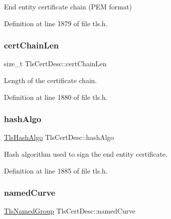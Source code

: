End entity certificate chain (P\+EM format) 



Definition at line 1879 of file tls.\+h.

\mbox{\label{structTlsCertDesc_a3b679e405c99f9989713292148f36149}} 
\subsubsection{\texorpdfstring{cert\+Chain\+Len}{certChainLen}}
{\footnotesize\ttfamily size\+\_\+t Tls\+Cert\+Desc\+::cert\+Chain\+Len}



Length of the certificate chain. 



Definition at line 1880 of file tls.\+h.

\mbox{\label{structTlsCertDesc_ad579e322e6688389f98141972794e243}} 
\subsubsection{\texorpdfstring{hash\+Algo}{hashAlgo}}
{\footnotesize\ttfamily \hyperlink{tls_8h_a98b0299cd7e197edc67123642089156d}{Tls\+Hash\+Algo} Tls\+Cert\+Desc\+::hash\+Algo}



Hash algorithm used to sign the end entity certificate. 



Definition at line 1885 of file tls.\+h.

\mbox{\label{structTlsCertDesc_a8b80a193be9a9d1064b2226ce1dce6bd}} 
\subsubsection{\texorpdfstring{named\+Curve}{namedCurve}}
{\footnotesize\ttfamily \hyperlink{tls_8h_ae51675bb94f1945c0eed549ef93e6b51}{Tls\+Named\+Group} Tls\+Cert\+Desc\+::named\+Curve}



